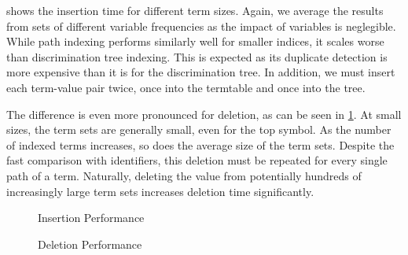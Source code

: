  shows the insertion time for different term sizes. Again, we average the results from sets of different variable frequencies as the impact of variables is neglegible.
While path indexing performs similarly well for smaller indices, it scales worse than discrimination tree indexing. This is expected as its duplicate detection is more expensive than it is for the discrimination tree. In addition, we must insert each term-value pair twice, once into the termtable and once into the tree.

The difference is even more pronounced for deletion, as can be seen in \cref{delete}. At small sizes, the term sets are generally small, even for the top symbol. As the number of indexed terms increases, so does the average size of the term sets. Despite the fast comparison with identifiers, this deletion must be repeated for every single path of a term. Naturally, deleting the value from potentially hundreds of increasingly large term sets increases deletion time significantly.

\begin{figure}[h]
  \begin{minipage}{0.45\textwidth}
\begin{adjustbox}{width=1\textwidth}
\end{adjustbox}
\caption{Insertion Performance}
\label{insert}
\end{minipage}
\begin{minipage}{0.1\textwidth}
\end{minipage}
\begin{minipage}{0.45\textwidth}
\begin{adjustbox}{width=1\textwidth}
\end{adjustbox}
\caption{Deletion Performance}
\label{delete}
\end{minipage}
\end{figure}


